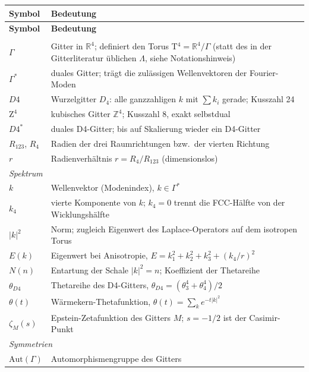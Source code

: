 \begin{center}
\renewcommand{\arraystretch}{1.3}
{\small\setlength\tabcolsep{5pt}
\begin{longtable}{lp{9.6cm}}
\toprule
\textbf{Symbol} & \textbf{Bedeutung} \\
\midrule
\endfirsthead
\toprule
\textbf{Symbol} & \textbf{Bedeutung} \\
\midrule
\endhead
\bottomrule
\endfoot
\multicolumn{2}{l}{\textit{Gitter und Torus}} \\
$\Gamma$ & Gitter in $\mathbb{R}^4$; definiert den Torus
  T$^4 = \mathbb{R}^4/\Gamma$ (statt des in der Gitterliteratur
  üblichen $\Lambda$, siehe Notationshinweis) \\
$\Gamma^{*}$ & duales Gitter; trägt die zulässigen Wellenvektoren
  der Fourier-Moden \\
$D4$ & Wurzelgitter $D_4$: alle ganzzahligen $k$ mit
  $\sum k_i$ gerade; Kusszahl 24 \\
$\text{Z}^4$ & kubisches Gitter $\mathbb{Z}^4$; Kusszahl 8,
  exakt selbstdual \\
$D4^{*}$ & duales D4-Gitter; bis auf Skalierung wieder ein
  D4-Gitter \\
$R_{123}$, $R_4$ & Radien der drei Raumrichtungen bzw.\ der
  vierten Richtung \\
$r$ & Radienverhältnis $r = R_4/R_{123}$ (dimensionslos) \\
\midrule
\multicolumn{2}{l}{\textit{Spektrum}} \\
$k$ & Wellenvektor (Modenindex), $k \in \Gamma^{*}$ \\
$k_4$ & vierte Komponente von $k$; $k_4 = 0$ trennt die
  FCC-Hälfte von der Wicklungshälfte \\
$|k|^2$ & Norm; zugleich Eigenwert des Laplace-Operators auf dem
  isotropen Torus \\
$E(k)$ & Eigenwert bei Anisotropie,
  $E = k_1^2+k_2^2+k_3^2+(k_4/r)^2$ \\
$N(n)$ & Entartung der Schale $|k|^2 = n$; Koeffizient der
  Thetareihe \\
$\theta_{D4}$ & Thetareihe des D4-Gitters,
  $\theta_{D4} = (\theta_3^4+\theta_4^4)/2$ \\
$\theta(t)$ & Wärmekern-Thetafunktion, $\theta(t) = \sum_k
  e^{-t|k|^2}$ \\
$\zeta_M(s)$ & Epstein-Zetafunktion des Gitters $M$;
  $s = -1/2$ ist der Casimir-Punkt \\
\midrule
\multicolumn{2}{l}{\textit{Symmetrien}} \\
$\text{Aut}(\Gamma)$ & Automorphismengruppe des Gitters

\end{longtable}}
\end{center}
